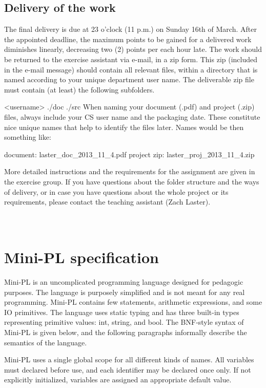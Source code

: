 \documentclass[english,11pt,twoside,a4paper]{article}
\begin{document}
\subsection{Delivery of the work}

The final delivery is due at 23 o'clock (11 p.m.) on Sunday 16th of March. After the appointed deadline, the maximum points to be gained for a delivered work diminishes linearly, decreasing two (2) points per each hour late.
The work should be returned to the exercise assistant via e-mail, in a zip form. This zip (included in the e-mail message) should contain all relevant files, within a directory that is named according to your unique department user name. The deliverable zip file must contain (at least) the following subfolders.

  <username>
    ./doc
    ./src 
When naming your document (.pdf) and project (.zip) files, always include your CS user name and the packaging date. These constitute nice unique names that help to identify the files later. Names would be then something like: 
 
   document:  laster\_doc\_2013\_11\_4.pdf 
   project zip: laster\_proj\_2013\_11\_4.zip

More detailed instructions and the requirements for the assignment are given in the exercise group. If you have questions about the folder structure and the ways of delivery, or in case you have questions about the whole project or its requirements, please contact the teaching assistant (Zach Laster).

\newpage
\section{\\Mini-PL specification} \label{App:MiniPLSpec}

Mini-PL is an uncomplicated programming language designed for pedagogic purposes. The language is purposely simplified and is not meant for any real programming. Mini-PL contains few statements, arithmetic expressions, and some IO primitives. The language uses static typing and has three built-in types representing primitive values: int, string, and bool. The BNF-style syntax of Mini-PL is given below, and the following paragraphs informally describe the semantics of the language. 
 
Mini-PL uses a single global scope for all different kinds of names. All variables must declared before use, and each identifier may be declared once only. If not explicitly initialized, variables are assigned an appropriate default value. 
 
\end{document}
